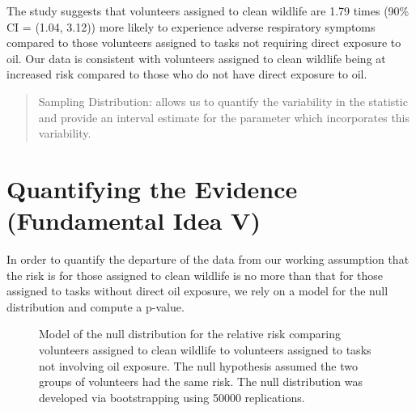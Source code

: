 \documentclass[
  letterpaper,
  DIV=11,
  numbers=noendperiod]{scrreprt}
\theoremstyle{definition}
\theoremstyle{definition}
\theoremstyle{plain}
\theoremstyle{remark}
\begin{document}
The study suggests that volunteers assigned to clean wildlife are 1.79
times (90\% CI = (1.04, 3.12)) more likely to experience adverse
respiratory symptoms compared to those volunteers assigned to tasks not
requiring direct exposure to oil. Our data is consistent with volunteers
assigned to clean wildlife being at increased risk compared to those who
do not have direct exposure to oil.

\begin{quote}
Sampling Distribution: allows us to quantify the variability in the
statistic and provide an interval estimate for the parameter which
incorporates this variability.
\end{quote}

\section{Quantifying the Evidence (Fundamental Idea
V)}\label{quantifying-the-evidence-fundamental-idea-v}

In order to quantify the departure of the data from our working
assumption that the risk is for those assigned to clean wildlife is no
more than that for those assigned to tasks without direct oil exposure,
we rely on a model for the null distribution and compute a p-value.

\begin{figure}


\caption{\label{fig-recaplanguage-null-distribution}Model of the null
distribution for the relative risk comparing volunteers assigned to
clean wildlife to volunteers assigned to tasks not involving oil
exposure. The null hypothesis assumed the two groups of volunteers had
the same risk. The null distribution was developed via bootstrapping
using 50000 replications.}

\end{figure}%
\end{document}
